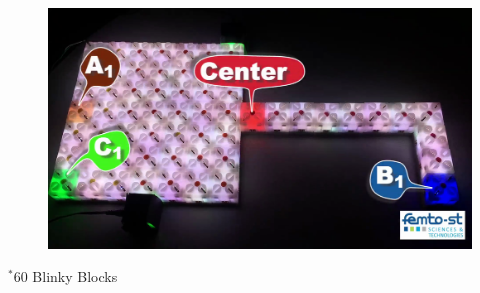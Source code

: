 \begin{frame}
 {
	\begin{figure}
		\centering
		\includegraphics[width=0.7\linewidth]{fig/centrality/abc-center-example-2/4}
	\end{figure}
}

\begin{center}
	\vspace{-0.5cm}\hspace*{5cm}$^*$60 Blinky Blocks
\end{center}

\end{frame}

